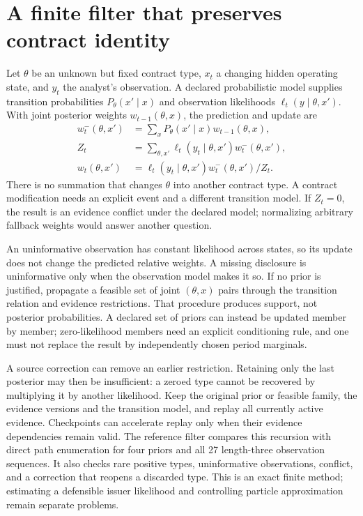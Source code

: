 

\section{A finite filter that preserves contract identity}
Let $\theta$ be an unknown but fixed contract type, $x_t$ a changing hidden
operating state, and $y_t$ the analyst's observation. A declared probabilistic
model supplies transition probabilities $P_\theta(x'\mid x)$ and observation
likelihoods $\ell_t(y\mid\theta,x')$. With joint posterior weights
$w_{t-1}(\theta,x)$, the prediction and update are
\begin{align}
w_t^-(\theta,x')&=\sum_x
  P_\theta(x'\mid x)w_{t-1}(\theta,x),\\
Z_t&=\sum_{\theta,x'}\ell_t(y_t\mid\theta,x')w_t^-(\theta,x'),\\
w_t(\theta,x')&=\ell_t(y_t\mid\theta,x')w_t^-(\theta,x')/Z_t.
\end{align}
There is no summation that changes $\theta$ into another contract type. A
contract modification needs an explicit event and a different transition
model. If $Z_t=0$, the result is an evidence conflict under the declared model;
normalizing arbitrary fallback weights would answer another question.

An uninformative observation has constant likelihood across states, so its
update does not change the predicted relative weights. A missing disclosure
is uninformative only when the observation model makes it so. If no prior is
justified, propagate a feasible set of joint $(\theta,x)$ pairs through the
transition relation and evidence restrictions. That procedure produces support,
not posterior probabilities. A declared set of priors can instead be updated
member by member; zero-likelihood members need an explicit conditioning rule,
and one must not replace the result by independently chosen period marginals.

A source correction can remove an earlier restriction. Retaining only the
last posterior may then be insufficient: a zeroed type cannot be recovered
by multiplying it by another likelihood. Keep the original prior or feasible
family, the evidence versions and the transition model, and replay all
currently active evidence. Checkpoints can accelerate replay only when their
evidence dependencies remain valid. The reference filter compares this
recursion with direct path enumeration for four priors and all 27 length-three
observation sequences. It also checks rare positive types, uninformative
observations, conflict, and a correction that reopens a discarded type. This
is an exact finite method; estimating a defensible issuer likelihood and
controlling particle approximation remain separate problems.

